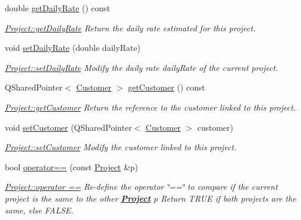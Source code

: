 \begin{DoxyCompactItemize}
double \hyperlink{classModels_1_1Project_a46d74a7452e712d223f1ca444a4cc180}{get\+Daily\+Rate} () const 
\begin{DoxyCompactList}\small\item\em \hyperlink{classModels_1_1Project_a46d74a7452e712d223f1ca444a4cc180}{Project\+::get\+Daily\+Rate} Return the daily rate estimated for this project. \end{DoxyCompactList}\item 
void \hyperlink{classModels_1_1Project_a9bc03d9632334a550bd25f6286d2c7a2}{set\+Daily\+Rate} (double daily\+Rate)
\begin{DoxyCompactList}\small\item\em \hyperlink{classModels_1_1Project_a9bc03d9632334a550bd25f6286d2c7a2}{Project\+::set\+Daily\+Rate} Modify the daily rate {\itshape daily\+Rate} of the current project. \end{DoxyCompactList}\item 
Q\+Shared\+Pointer$<$ \hyperlink{classModels_1_1Customer}{Customer} $>$ \hyperlink{classModels_1_1Project_ad15f442a24c9d42144b73f27a7afaa35}{get\+Customer} () const 
\begin{DoxyCompactList}\small\item\em \hyperlink{classModels_1_1Project_ad15f442a24c9d42144b73f27a7afaa35}{Project\+::get\+Customer} Return the reference to the customer linked to this project. \end{DoxyCompactList}\item 
void \hyperlink{classModels_1_1Project_a9d305edf054735b911e144516d3eccba}{set\+Customer} (Q\+Shared\+Pointer$<$ \hyperlink{classModels_1_1Customer}{Customer} $>$ customer)
\begin{DoxyCompactList}\small\item\em \hyperlink{classModels_1_1Project_a9d305edf054735b911e144516d3eccba}{Project\+::set\+Customer} Modify the {\itshape customer} linked to this project. \end{DoxyCompactList}\item 
bool \hyperlink{classModels_1_1Project_a2f322e63f6b42273c24093b9df46c2d6}{operator==} (const \hyperlink{classModels_1_1Project}{Project} \&p)
\begin{DoxyCompactList}\small\item\em \hyperlink{classModels_1_1Project_a2f322e63f6b42273c24093b9df46c2d6}{Project\+::operator ==} Re-\/define the operator \char`\"{}==\char`\"{} to compare if the current project is the same to the other {\bfseries \hyperlink{classModels_1_1Project}{Project}} {\itshape p} Return T\+R\+U\+E if both projects are the same, else F\+A\+L\+S\+E. \end{DoxyCompactList}\item 

\end{DoxyCompactItemize}
